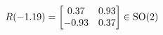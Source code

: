 \documentclass[preview]{standalone}
\begin{document}
\begin{align*}
\special{dvisvgm:raw <g id='unique000'>}R(-1.19) = \begin{bmatrix} 0.37 & 0.93 \\ -0.93 & 0.37 \end{bmatrix} \in \text{SO}(2)\special{dvisvgm:raw </g>}
\end{align*}
\end{document}
